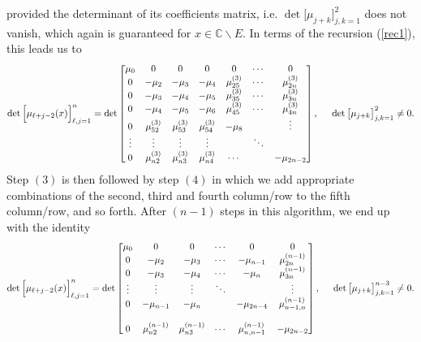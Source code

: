 \documentclass[10pt,oneside,reqno]{amsart}
\numberwithin{equation}{section}
\def\eqref#1{(\ref{#1})}
\begin{document}
provided the determinant of its coefficients matrix, i.e. $\det\big[\mu_{j+k}\big]_{j,k=1}^2$ does not vanish, which again is guaranteed for 
$x\in\mathbb{C}\backslash E$. In terms of the recursion \eqref{rec1}, this leads us to
\begin{equation*}
  \det\Big[\mu_{\ell+j-2}(x)\Big]_{\ell,j=1}^{n} =\det\begin{bmatrix}
                                                       \mu_0 & 0 & 0 & 0 & 0 &\cdots & 0\\
0 & -\mu_2 & -\mu_3 & -\mu_4 & \mu_{25}^{(3)} & \cdots & \mu_{2n}^{(3)}\\
0 & -\mu_3 & -\mu_4 & -\mu_5 & \mu_{35}^{(3)} &\cdots & \mu_{3n}^{(3)}\\
0 & -\mu_4 & -\mu_5 & -\mu_6 & \mu_{45}^{(3)} & \cdots & \mu_{4n}^{(3)}\\
0 & \mu_{52}^{(3)} & \mu_{53}^{(3)} & \mu_{54}^{(3)} & -\mu_8 & & \vdots\\
\vdots & \vdots & \vdots & \vdots & &\ddots &\\
0 & \mu_{n2}^{(3)} & \mu_{n3}^{(3)} & \mu_{n4}^{(3)} & \cdots & & -\mu_{2n-2}\\
                                                      \end{bmatrix},\hspace{0.5cm}\det\big[\mu_{j+k}\big]_{j,k=1}^2\neq 0.
\end{equation*}
Step $(3)$ is then followed by step $(4)$ in which we add appropriate combinations of the second, third and fourth column/row to the fifth column/row, and so forth.
After $(n-1)$ steps in this algorithm, we end up with the identity
\begin{equation*}
  \det\Big[\mu_{\ell+j-2}(x)\Big]_{\ell,j=1}^{n} =\det\begin{bmatrix}
                                                       \mu_0 & 0 & 0 & \cdots &0 & 0\\
0 & -\mu_2 & -\mu_3 & \cdots & -\mu_{n-1} &  \mu_{2n}^{(n-1)}\\
0 & -\mu_3 & -\mu_4 & \cdots & -\mu_n &  \mu_{3n}^{(n-1)}\\
\vdots & \vdots & \vdots & \ddots &   & \vdots\\
0 & -\mu_{n-1} & -\mu_n &  & -\mu_{2n-4} & \mu_{n-1,n}^{(n-1)}\\
& & & & & \\
0 & \mu_{n2}^{(n-1)} & \mu_{n3}^{(n-1)} & \cdots & \mu_{n,n-1}^{(n-1)}  & -\mu_{2n-2}\\
                                                      \end{bmatrix},\hspace{0.5cm}\det\big[\mu_{j+k}\big]_{j,k=1}^{n-3}\neq 0.
\end{equation*}
\end{document}
